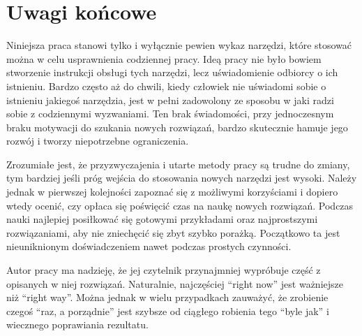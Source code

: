 \chapter{Uwagi końcowe}

Niniejsza praca stanowi tylko i wyłącznie pewien wykaz narzędzi, które stosować można w celu usprawnienia codziennej pracy. Ideą pracy nie było bowiem stworzenie instrukcji obsługi tych narzędzi, lecz uświadomienie odbiorcy o ich istnieniu. Bardzo często aż do chwili, kiedy człowiek nie uświadomi sobie o istnieniu jakiegoś narzędzia, jest w pełni zadowolony ze sposobu w jaki radzi sobie z codziennymi wyzwaniami. Ten brak świadomości, przy jednoczesnym braku motywacji do szukania nowych rozwiązań, bardzo skutecznie hamuje jego rozwój i tworzy niepotrzebne ograniczenia.

Zrozumiałe jest, że przyzwyczajenia i utarte metody pracy są trudne do zmiany, tym bardziej jeśli próg wejścia do stosowania nowych narzędzi jest wysoki. Należy jednak w pierwszej kolejności zapoznać się z możliwymi korzyściami i dopiero wtedy ocenić, czy opłaca się poświęcić czas na naukę nowych rozwiązań. Podczas nauki najlepiej posiłkować się gotowymi przykładami oraz najprostszymi rozwiązaniami, aby nie zniechęcić się zbyt szybko porażką. Początkowo ta jest nieuniknionym doświadczeniem nawet podczas prostych czynności.

Autor pracy ma nadzieję, że jej czytelnik przynajmniej wypróbuje część z opisanych w niej rozwiązań. Naturalnie, najczęściej \enquote{right now} jest ważniejsze niż \enquote{right way}. Można jednak w wielu przypadkach zauważyć, że zrobienie czegoś \enquote{raz, a porządnie} jest szybsze od ciągłego robienia tego \enquote{byle jak} i wiecznego poprawiania rezultatu.
